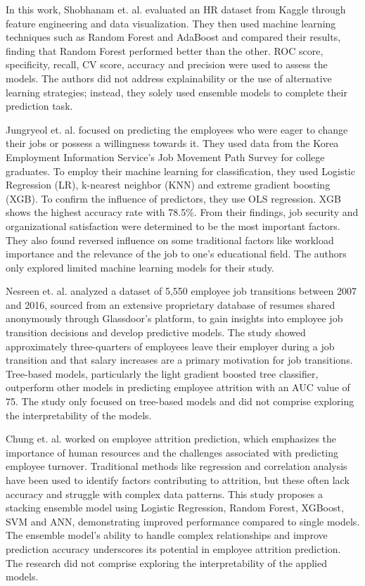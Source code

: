 \documentclass[a4paper,fleqn]{cas-sc}
\begin{document}
In this work, Shobhanam et. al. \cite{Krishna2022} evaluated an HR dataset from Kaggle through feature engineering and data visualization. They then used machine learning techniques such as Random Forest and AdaBoost and compared their results, finding that Random Forest performed better than the other. ROC score, specificity, recall, CV score, accuracy and precision were used to assess the models. The authors did not address explainability or the use of alternative learning strategies; instead, they solely used ensemble models to complete their prediction task.

Jungryeol et. al. \cite{Park2024} focused on predicting the employees who were eager to change their jobs or possess a willingness towards it. They used data from the Korea Employment Information Service's Job Movement Path Survey for college graduates. To employ their machine learning for classification, they used Logistic Regression (LR), k-nearest neighbor (KNN) and extreme gradient boosting (XGB). To confirm the influence of predictors, they use OLS regression. XGB shows the highest accuracy rate with 78.5\%. From their findings, job security and organizational satisfaction were determined to be the most important factors. They also found reversed influence on some traditional factors like workload importance and the relevance of the job to one's educational field. The authors only explored limited machine learning models for their study.

Nesreen et. al. \cite{ElRayes2020} analyzed a dataset of 5,550 employee job transitions between 2007 and 2016, sourced from an extensive proprietary database of resumes shared anonymously through Glassdoor's platform, to gain insights into employee job transition decisions and develop predictive models. The study showed approximately three-quarters of employees leave their employer during a job transition and that salary increases are a primary motivation for job transitions. Tree-based models, particularly the light gradient boosted tree classifier, outperform other models in predicting employee attrition with an AUC value of 75. The study only focused on tree-based models and did not comprise exploring the interpretability of the models.

Chung et. al. \cite{CHUNG2023119364} worked on employee attrition prediction, which emphasizes the importance of human resources and the challenges associated with predicting employee turnover. Traditional methods like regression and correlation analysis have been used to identify factors contributing to attrition, but these often lack accuracy and struggle with complex data patterns. This study proposes a stacking ensemble model using Logistic Regression, Random Forest, XGBoost, SVM and ANN, demonstrating improved performance compared to single models. The ensemble model's ability to handle complex relationships and improve prediction accuracy underscores its potential in employee attrition prediction. The research did not comprise exploring the interpretability of the applied models.
\end{document}
